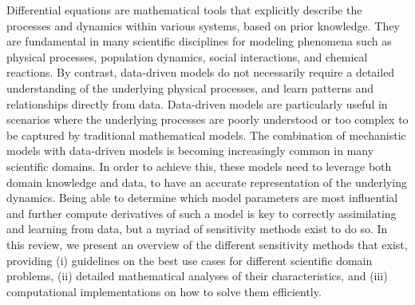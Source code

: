 Differential equations are mathematical tools that explicitly describe the processes and dynamics within various systems, based on prior knowledge. 
They are fundamental in many scientific disciplines for modeling phenomena such as physical processes, population dynamics, social interactions, and chemical reactions.
By contrast, data-driven models do not necessarily require a detailed understanding of the underlying physical processes, and learn patterns and relationships directly from data. 
Data-driven models are particularly useful in scenarios where the underlying processes are poorly understood or too complex to be captured by traditional mathematical models.
The combination of mechanistic models with data-driven models is becoming increasingly common in many scientific domains. 
In order to achieve this, these models need to leverage both domain knowledge and data, to have an accurate representation of the underlying dynamics. 
Being able to determine which model parameters are most influential and further compute derivatives of such a model is key to correctly assimilating and learning from data, but a myriad of sensitivity methods exist to do so. 
In this review, we present an overview of the different sensitivity methods that exist, providing (i) guidelines on the best use cases for different scientific domain problems, (ii) detailed mathematical analyses of their characteristics, and (iii) computational implementations on how to solve them efficiently. 
